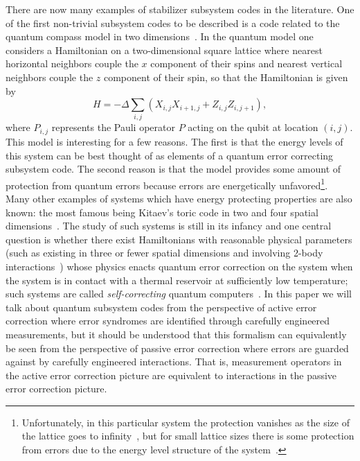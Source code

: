 \documentclass[twocolumn,showpacs,preprintnumbers,amsmath,amssymb,nofootinbib,pra,floatfix]{revtex4-1}
\begin{document}
There are now many examples of stabilizer subsystem codes in the literature.  One of the first non-trivial subsystem codes to be described is a code related to the quantum compass model in two dimensions~\cite{Bacon:01a,Dorier:05a,Bacon:06a}.  In the quantum model one considers a Hamiltonian on a two-dimensional square lattice where nearest horizontal neighbors couple the $x$ component of their spins and nearest vertical neighbors couple the $z$ component of their spin, so that the Hamiltonian is given by
\begin{equation}
H=-\Delta \sum_{i,j} (X_{i,j} X_{i+1,j} +Z_{i,j} Z_{i,j+1}),
\end{equation}
where $P_{i,j}$ represents the Pauli operator $P$ acting on the qubit at location $(i,j)$.  This model is interesting for a few reasons.  The first is that the energy levels of this system can be best thought of as elements of a quantum error correcting subsystem code.  The second reason is that the model provides some amount of protection from quantum errors because errors are energetically unfavored\footnote{Unfortunately, in this particular system the protection vanishes as the size of the lattice goes to infinity~\cite{Dorier:05a}, but for small lattice sizes there is some protection from errors due to the energy level structure of the system~\cite{Bacon:01a}.}.  Many other examples of systems which have energy protecting properties are also known: the most famous being Kitaev's toric code in two and four spatial dimensions~\cite{Kitaev:97c,Kitaev:03a,Dennis:02a}.  The study of such systems is still in its infancy and one central question is whether there exist Hamiltonians with reasonable physical parameters (such as existing in three or fewer spatial dimensions and involving 2-body interactions~\cite{Bravyi:09a,Bravyi:10b}) whose physics enacts quantum error correction on the system when the system is in contact with a thermal reservoir at sufficiently low temperature; such systems are called \emph{self-correcting} quantum computers~\cite{Bacon:06a,Bombin:09a}.  In this paper we will talk about quantum subsystem codes from the perspective of active error correction where error syndromes are identified through carefully engineered measurements, but it should be understood that this formalism can equivalently be seen from the perspective of passive error correction where errors are guarded against by carefully engineered interactions.  That is, measurement operators in the active error correction picture are equivalent to interactions in the passive error correction picture.
\end{document}
